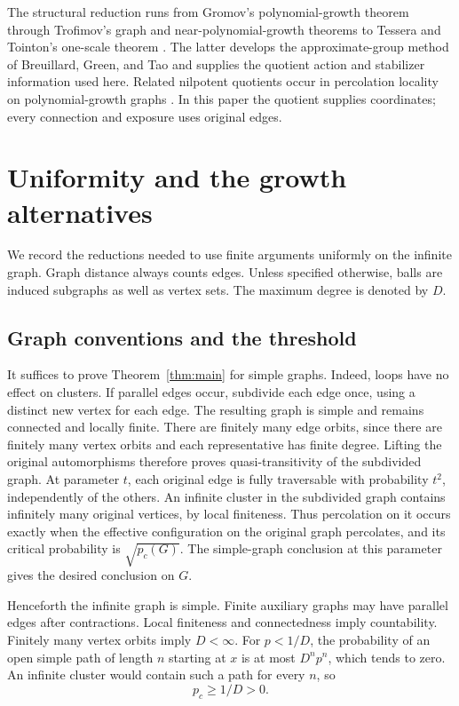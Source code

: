 \documentclass[11pt]{article}
\theoremstyle{definition}
\newcommand{\pc}{p_c}
\begin{document}
The structural reduction runs from Gromov's polynomial-growth
theorem \cite{Gromov1981} through Trofimov's graph and
near-polynomial-growth theorems \cite{Trofimov1985,Trofimov2003}
to Tessera and Tointon's one-scale theorem
\cite[Corollary~2.4]{TesseraTointon2021}. The latter develops the
approximate-group method of Breuillard, Green, and Tao
\cite{BreuillardGreenTao2012} and supplies the quotient action and
stabilizer information used here. Related nilpotent quotients occur
in percolation locality on polynomial-growth graphs
\cite{ContrerasMartineauTassion2023Locality}. In this paper the
quotient supplies coordinates; every connection and exposure uses
original edges.

\section{Uniformity and the growth alternatives}
\label{sec:preliminaries}

We record the reductions needed to use finite arguments uniformly on
the infinite graph. Graph distance always counts edges. Unless
specified otherwise, balls are induced subgraphs as well as vertex
sets. The maximum degree is denoted by $D$.

\subsection{Graph conventions and the threshold}

It suffices to prove Theorem~\ref{thm:main} for simple graphs.
Indeed, loops have no effect on clusters. If parallel edges occur,
subdivide each edge once, using a distinct new vertex for each edge.
The resulting graph is simple and remains connected and locally
finite. There are finitely many edge orbits, since there are finitely
many vertex orbits and each representative has finite degree.
Lifting the original automorphisms therefore proves quasi-transitivity
of the subdivided graph. At parameter $t$, each original edge is
fully traversable with probability $t^2$, independently of the others.
An infinite cluster in the subdivided graph contains infinitely many
original vertices, by local finiteness. Thus percolation on it occurs
exactly when the effective configuration on the original graph
percolates, and its critical probability is $\sqrt{\pc(G)}$.
The simple-graph conclusion at this parameter gives the desired
conclusion on $G$.

Henceforth the infinite graph is simple. Finite auxiliary graphs may
have parallel edges after contractions. Local finiteness and
connectedness imply countability. Finitely many vertex orbits imply $D<\infty$.
For $p<1/D$, the probability of an open simple path of length $n$
starting at $x$ is at most $D^np^n$, which tends to zero. An infinite
cluster would contain such a path for every $n$, so
\begin{equation}
\label{eq:positive-threshold}
 \pc\ge 1/D>0.
\end{equation}
\end{document}
